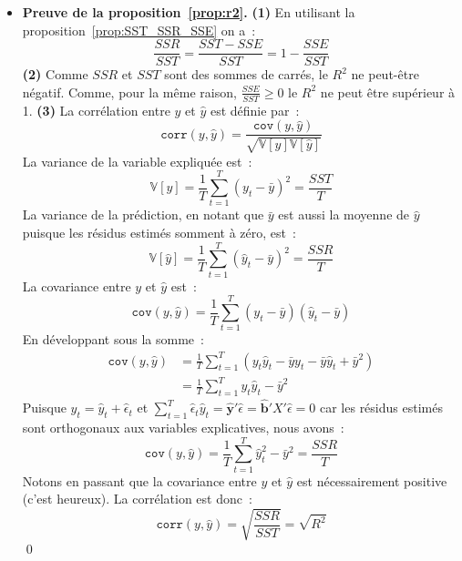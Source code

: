 \documentclass[10pt]{beamer}
\begin{document}
\begin{notes}
  \begin{itemize}
  \item \textbf{Preuve de la proposition~\ref{prop:r2}.} \textbf{(1)} En utilisant la proposition~\ref{prop:SST_SSR_SSE} on a~:
    \[
      \frac{SSR}{SST} = \frac{SST-SSE}{SST} = 1 - \frac{SSE}{SST}
    \]
    \textbf{(2)} Comme $SSR$ et $SST$ sont des sommes de carrés, le $R^2$ ne peut-être négatif. Comme, pour la même raison, $\frac{SSE}{SST}\geq 0$ le $R^2$ ne peut être supérieur à 1. \textbf{(3)} La corrélation entre $y$ et $\hat y$ est définie par~:
    \[
      \mathtt{corr}(y,\hat y) = \frac{\mathtt{cov}(y,\hat y)}{\sqrt{\mathbb V[y]\mathbb V[\hat y]}}
    \]
    La variance de la variable expliquée est~:
    \[
      \mathbb V [y] = \frac{1}{T}\sum_{t=1}^T(y_t-\bar y)^2 = \frac{SST}{T}
    \]
    La variance de la prédiction, en notant que $\bar y$ est aussi la moyenne de $\hat y$ puisque les résidus estimés somment à zéro, est~:
    \[
      \mathbb V [\hat y] = \frac{1}{T}\sum_{t=1}^T(\hat y_t-\bar y)^2 = \frac{SSR}{T}
    \]
    La covariance entre $y$ et $\hat y$ est~:
    \[
      \mathtt{cov}(y,\hat y) = \frac{1}{T}\sum_{t=1}^T(y_t-\bar y)(\hat y_t- \bar y)
    \]
    En développant sous la somme~:
    \[
      \begin{split}
        \mathtt{cov}(y,\hat y) &= \frac{1}{T}\sum_{t=1}^T \left(y_t\hat y_t - \bar y y_t - \bar y \hat y_t + \bar y^2\right)\\
                               &= \frac{1}{T}\sum_{t=1}^T y_t\hat y_t - \bar y^2
      \end{split}
    \]
    Puisque $y_t = \hat y_t + \hat \epsilon_t$ et $\sum_{t=1}^T\hat \epsilon_t \hat y_t  = \hat{\mathbf y}'\hat\epsilon = \hat{\mathbf b}'X'\hat\epsilon = 0$ car les résidus estimés sont orthogonaux aux variables explicatives, nous avons~:
    \[
      \mathtt{cov}(y,\hat y) = \frac{1}{T}\sum_{t=1}^T\hat y_t^2 - \bar y^2 = \frac{SSR}{T}
    \]
    Notons en passant que la covariance entre $y$ et $\hat y$ est nécessairement positive (c'est heureux). La corrélation est donc~:
    \[
      \mathtt{corr}(y,\hat y) = \sqrt{\frac{SSR}{SST}} = \sqrt{R^2}
    \]
    \qed\newline
  \end{itemize}
\end{notes}
\end{document}
